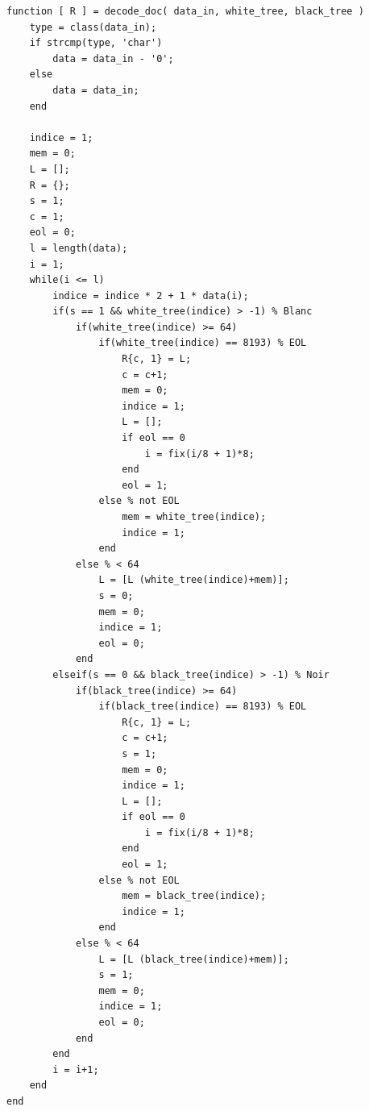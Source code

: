 \documentclass[11pt]{article}
\begin{document}
	\begin{lstlisting}
function [ R ] = decode_doc( data_in, white_tree, black_tree )
	type = class(data_in);
	if strcmp(type, 'char')
		data = data_in - '0';
	else
		data = data_in;
	end

	indice = 1;
	mem = 0;
	L = [];
	R = {};
	s = 1;
	c = 1;
	eol = 0;
	l = length(data);
	i = 1;
	while(i <= l)
		indice = indice * 2 + 1 * data(i);
		if(s == 1 && white_tree(indice) > -1) % Blanc
			if(white_tree(indice) >= 64)
				if(white_tree(indice) == 8193) % EOL
					R{c, 1} = L;
					c = c+1;
					mem = 0;
					indice = 1;
					L = [];
					if eol == 0
						i = fix(i/8 + 1)*8;
					end
					eol = 1;
				else % not EOL
					mem = white_tree(indice);
					indice = 1;
				end
			else % < 64
				L = [L (white_tree(indice)+mem)];
				s = 0;
				mem = 0;
				indice = 1;
				eol = 0;
			end
		elseif(s == 0 && black_tree(indice) > -1) % Noir
			if(black_tree(indice) >= 64)
				if(black_tree(indice) == 8193) % EOL
					R{c, 1} = L;
					c = c+1;
					s = 1;
					mem = 0;
					indice = 1;
					L = [];
					if eol == 0
						i = fix(i/8 + 1)*8;
					end
					eol = 1;
				else % not EOL
					mem = black_tree(indice);
					indice = 1;
				end
			else % < 64
				L = [L (black_tree(indice)+mem)];
				s = 1;
				mem = 0;
				indice = 1;
				eol = 0;
			end
		end
		i = i+1;
	end
end
	\end{lstlisting}
	
\end{document}
